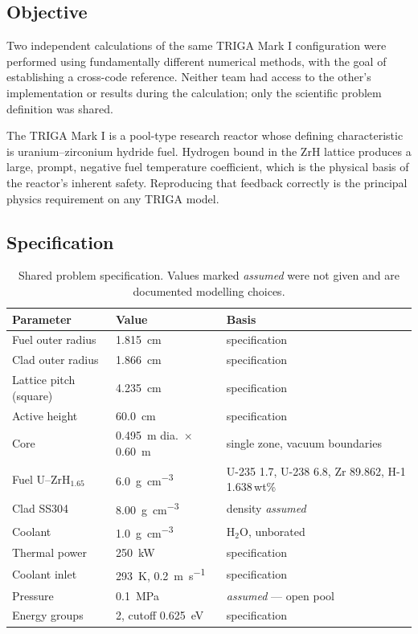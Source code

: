 \documentclass[11pt,a4paper]{article}
\begin{document}
\subsection{Objective}
Two independent calculations of the same TRIGA Mark I configuration were performed using
fundamentally different numerical methods, with the goal of establishing a cross-code
reference. Neither team had access to the other's implementation or results during the
calculation; only the scientific problem definition was shared.

The TRIGA Mark I is a pool-type research reactor whose defining characteristic is
uranium--zirconium hydride fuel. Hydrogen bound in the ZrH lattice produces a large, prompt,
negative fuel temperature coefficient, which is the physical basis of the reactor's inherent
safety. Reproducing that feedback correctly is the principal physics requirement on any
TRIGA model.

\subsection{Specification}
\begin{table}[H]\centering\small
\caption{Shared problem specification. Values marked \emph{assumed} were not given and are
documented modelling choices.}
\begin{tabular}{@{}llp{62mm}@{}}
\toprule
\textbf{Parameter} & \textbf{Value} & \textbf{Basis}\\
\midrule
Fuel outer radius & \SI{1.815}{\centi\meter} & specification\\
Clad outer radius & \SI{1.866}{\centi\meter} & specification\\
Lattice pitch (square) & \SI{4.235}{\centi\meter} & specification\\
Active height & \SI{60.0}{\centi\meter} & specification\\
Core & \SI{0.495}{\meter} dia.\ $\times$ \SI{0.60}{\meter} & single zone, vacuum boundaries\\
\midrule
Fuel U--ZrH$_{1.65}$ & \SI{6.0}{\gram\per\cubic\centi\meter} &
  U-235 1.7, U-238 6.8, Zr 89.862, H-1 1.638\,wt\%\\
Clad SS304 & \SI{8.00}{\gram\per\cubic\centi\meter} & density \emph{assumed}\\
Coolant & \SI{1.0}{\gram\per\cubic\centi\meter} & H$_2$O, unborated\\
\midrule
Thermal power & \SI{250}{\kilo\watt} & specification\\
Coolant inlet & \SI{293}{\kelvin}, \SI{0.2}{\meter\per\second} & specification\\
Pressure & \SI{0.1}{\mega\pascal} & \emph{assumed} --- open pool\\
Energy groups & 2, cutoff \SI{0.625}{\electronvolt} & specification\\
\bottomrule
\end{tabular}
\end{table}
\end{document}
